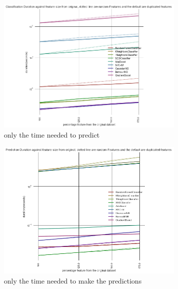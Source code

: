 \documentclass[a4paper,10pt]{article}
\begin{document}
\begin{figure}[H]
	\centering	
	\begin{subfigure}[b]{0.45\textwidth}
		\includegraphics[width=\textwidth]{images/appendix/FeatAddDupRandPredClass.png}
		\caption{only the time needed to predict }
		\label{fig:SADRC2}
	\end{subfigure}
	\begin{subfigure}[b]{0.45\textwidth}
		\includegraphics[width=\textwidth]{images/appendix/FeatAddDupRandPred.png}
		\caption{only the time needed to make the predictions}
		\label{fig:SADRP2}
	\end{subfigure}
	\begin{subfigure}[b]{0.45\textwidth}

\end{subfigure}
\end{figure}
\end{document}

